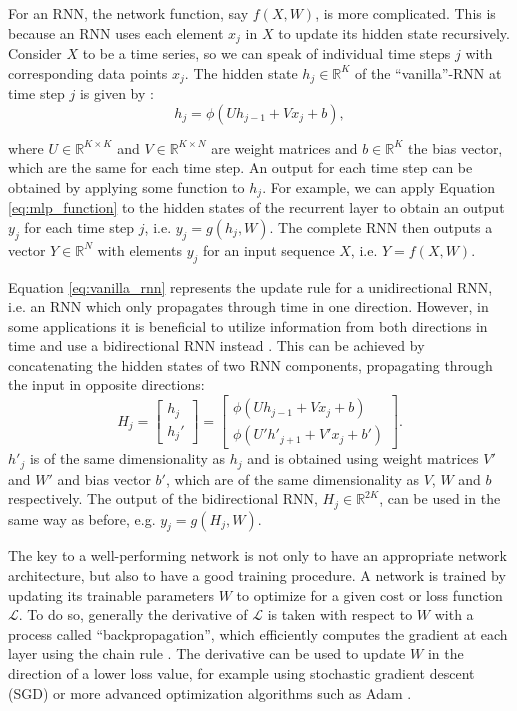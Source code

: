 For an RNN, the network function, say $f(X,W)$, is more complicated. This is because an RNN uses each element $x_j$ in $X$ to update its hidden state recursively. Consider $X$ to be a time series, so we can speak of individual time steps $j$ with corresponding data points $x_j$. The hidden state $h_{j} \in \mathbb{R}^K$ of the ``vanilla''-RNN at time step $j$ is given by \citep{yu2019review}: 
\begin{equation}
    \label{eq:vanilla_rnn}
    h_{j} = \phi(U h_{j-1} + V x_j + b),
\end{equation}

\noindent where $U \in \mathbb{R}^{K \times K}$ and $V \in \mathbb{R}^{K \times N}$ are weight matrices and $b \in \mathbb{R}^{K}$ the bias vector, which are the same for each time step. An output for each time step can be obtained by applying some function to $h_{j}$. For example, we can apply Equation \ref{eq:mlp_function} to the hidden states of the recurrent layer to obtain an output $y_j$ for each time step $j$, i.e. $y_j= g(h_{j}, W)$. The complete RNN then outputs a vector $Y \in \mathbb{R}^N$ with elements $y_j$ for an input sequence $X$, i.e. $Y = f(X, W)$.

Equation \ref{eq:vanilla_rnn} represents the update rule for a unidirectional RNN, i.e. an RNN which only propagates through time in one direction. However, in some applications it is beneficial to utilize information from both directions in time and use a bidirectional RNN instead \citep{schuster1997bidirectional}. This can be achieved by concatenating the hidden states of two RNN components, propagating through the input in opposite directions:
\begin{equation}
    H_j =  
    \begin{bmatrix}
        h_j \\
        h_j'
    \end{bmatrix} =
    \begin{bmatrix}
        \phi(U h_{j-1} + V x_j + b) \\
        \phi(U' h'_{j+1} + V' x_j + b')
    \end{bmatrix}.
\end{equation}
$h'_j$ is of the same dimensionality as $h_j$ and is obtained using weight matrices $V'$ and $W'$ and bias vector $b'$, which are of the same dimensionality as $V$, $W$ and $b$ respectively. The output of the bidirectional RNN, $H_j \in \mathbb{R}^{2K}$, can be used in the same way as before, e.g. $y_j= g(H_{j}, W)$.

The key to a well-performing network is not only to have an appropriate network architecture, but also to have a good training procedure. A network is trained by updating its trainable parameters $W$ to optimize for a given cost or loss function $\mathcal{L}$. To do so, generally the derivative of $\mathcal{L}$ is taken with respect to $W$ with a process called ``backpropagation'', which efficiently computes the gradient at each layer using the chain rule \citep{rumelhart1985learning}. The derivative can be used to update $W$ in the direction of a lower loss value, for example using stochastic gradient descent (SGD) or more advanced optimization algorithms such as Adam \citep{kingma2014adam}.

